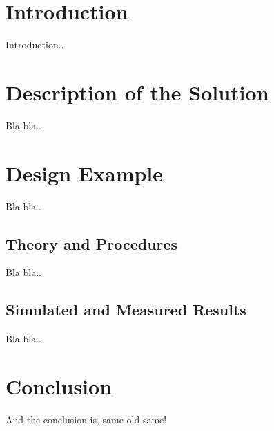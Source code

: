 \section{Introduction}

Introduction..

\section{Description of the Solution}

Bla bla..

\section{Design Example}

Bla bla..

\subsection{Theory and Procedures}

Bla bla..

\subsection{Simulated and Measured Results}

Bla bla..

\section{Conclusion}

And the conclusion is, same old same!